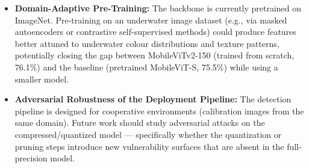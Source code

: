\begin{itemize}
    \item \textbf{Domain-Adaptive Pre-Training:}
    The backbone is currently pretrained on ImageNet. Pre-training on an underwater image dataset (e.g., via masked autoencoders or contrastive self-supervised methods) could produce features better attuned to underwater colour distributions and texture patterns, potentially closing the gap between MobileViTv2-150 (trained from scratch, 76.1\%) and the baseline (pretrained MobileViT-S, 75.5\%) while using a smaller model.

    \item \textbf{Adversarial Robustness of the Deployment Pipeline:}
    The detection pipeline is designed for cooperative environments (calibration images from the same domain). Future work should study adversarial attacks on the compressed/quantized model — specifically whether the quantization or pruning steps introduce new vulnerability surfaces that are absent in the full-precision model.

\end{itemize}
